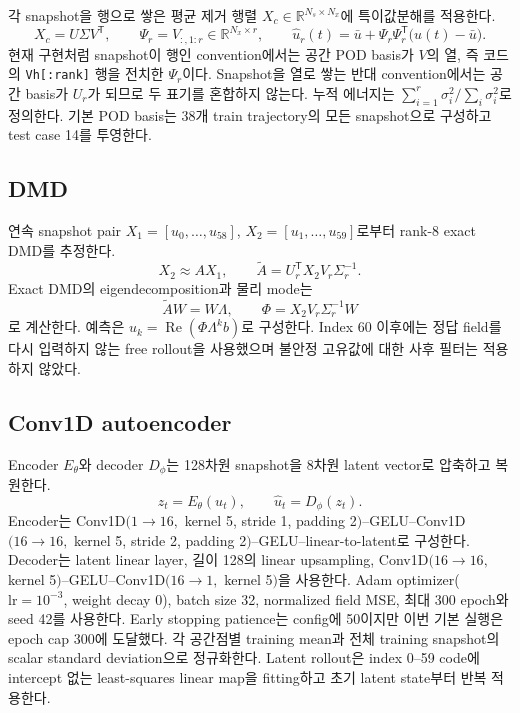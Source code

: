 \documentclass[11pt,a4paper]{article}
\begin{document}
각 snapshot을 행으로 쌓은 평균 제거 행렬 $X_c\in\mathbb{R}^{N_s\times N_x}$에 특이값분해를 적용한다.
\begin{equation}
  X_c=U\Sigma V^{\mathsf T},\qquad
  \Psi_r=V_{:,1:r}\in\mathbb{R}^{N_x\times r},\qquad
  \widehat u_r(t)=\bar{u}+\Psi_r\Psi_r^{\mathsf T}\bigl(u(t)-\bar{u}\bigr).
\end{equation}
현재 구현처럼 snapshot이 행인 convention에서는 공간 POD basis가 $V$의 열, 즉 코드의 \texttt{Vh[:rank]} 행을 전치한 $\Psi_r$이다. Snapshot을 열로 쌓는 반대 convention에서는 공간 basis가 $U_r$가 되므로 두 표기를 혼합하지 않는다. 누적 에너지는 $\sum_{i=1}^{r}\sigma_i^2/\sum_i\sigma_i^2$로 정의한다. 기본 POD basis는 38개 train trajectory의 모든 snapshot으로 구성하고 test case 14를 투영한다.

\subsection{DMD}

연속 snapshot pair $X_1=[u_0,\ldots,u_{58}]$, $X_2=[u_1,\ldots,u_{59}]$로부터 rank-8 exact DMD를 추정한다.
\begin{equation}
  X_2\approx AX_1,\qquad
  \widetilde A=U_r^{\mathsf T}X_2V_r\Sigma_r^{-1}.
\end{equation}
Exact DMD의 eigendecomposition과 물리 mode는
\begin{equation}
  \widetilde A W=W\Lambda,\qquad
  \Phi=X_2V_r\Sigma_r^{-1}W
\end{equation}
로 계산한다. 예측은 $u_k=\operatorname{Re}(\Phi\Lambda^kb)$로 구성한다.
Index 60 이후에는 정답 field를 다시 입력하지 않는 free rollout을 사용했으며 불안정 고유값에 대한 사후 필터는 적용하지 않았다.

\subsection{Conv1D autoencoder}

Encoder $E_\theta$와 decoder $D_\phi$는 128차원 snapshot을 8차원 latent vector로 압축하고 복원한다.
\begin{equation}
  z_t=E_\theta(u_t),\qquad \widehat u_t=D_\phi(z_t).
\end{equation}
Encoder는 Conv1D$(1\to16,$ kernel 5, stride 1, padding 2$)$--GELU--Conv1D$(16\to16,$ kernel 5, stride 2, padding 2$)$--GELU--linear-to-latent로 구성한다. Decoder는 latent linear layer, 길이 128의 linear upsampling, Conv1D$(16\to16,$ kernel 5$)$--GELU--Conv1D$(16\to1,$ kernel 5$)$을 사용한다. Adam optimizer($\mathrm{lr}=10^{-3}$, weight decay 0), batch size 32, normalized field MSE, 최대 300 epoch와 seed 42를 사용한다. Early stopping patience는 config에 50이지만 이번 기본 실행은 epoch cap 300에 도달했다. 각 공간점별 training mean과 전체 training snapshot의 scalar standard deviation으로 정규화한다. Latent rollout은 index 0--59 code에 intercept 없는 least-squares linear map을 fitting하고 초기 latent state부터 반복 적용한다.
\end{document}
